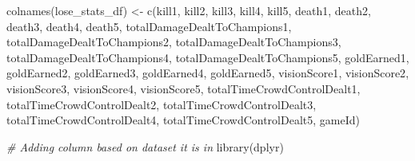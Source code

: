 \documentclass[
]{article}
\newenvironment{Shaded}{\begin{snugshade}}{\end{snugshade}}
\newcommand{\CommentTok}[1]{\textcolor[rgb]{0.56,0.35,0.01}{\textit{#1}}}
\newcommand{\FunctionTok}[1]{\textcolor[rgb]{0.00,0.00,0.00}{#1}}
\newcommand{\NormalTok}[1]{#1}
\newcommand{\OtherTok}[1]{\textcolor[rgb]{0.56,0.35,0.01}{#1}}
\newcommand{\StringTok}[1]{\textcolor[rgb]{0.31,0.60,0.02}{#1}}
\begin{document}
\begin{Shaded}
\begin{Highlighting}[]
\FunctionTok{colnames}\NormalTok{(lose\_stats\_df) }\OtherTok{\textless{}{-}} \FunctionTok{c}\NormalTok{(}\StringTok{\textquotesingle{}kill1\textquotesingle{}}\NormalTok{, }\StringTok{\textquotesingle{}kill2\textquotesingle{}}\NormalTok{, }\StringTok{\textquotesingle{}kill3\textquotesingle{}}\NormalTok{, }\StringTok{\textquotesingle{}kill4\textquotesingle{}}\NormalTok{, }\StringTok{\textquotesingle{}kill5\textquotesingle{}}\NormalTok{, }\StringTok{\textquotesingle{}death1\textquotesingle{}}\NormalTok{, }\StringTok{\textquotesingle{}death2\textquotesingle{}}\NormalTok{, }\StringTok{\textquotesingle{}death3\textquotesingle{}}\NormalTok{, }\StringTok{\textquotesingle{}death4\textquotesingle{}}\NormalTok{, }\StringTok{\textquotesingle{}death5\textquotesingle{}}\NormalTok{, }\StringTok{\textquotesingle{}totalDamageDealtToChampions1\textquotesingle{}}\NormalTok{, }\StringTok{\textquotesingle{}totalDamageDealtToChampions2\textquotesingle{}}\NormalTok{, }\StringTok{\textquotesingle{}totalDamageDealtToChampions3\textquotesingle{}}\NormalTok{, }\StringTok{\textquotesingle{}totalDamageDealtToChampions4\textquotesingle{}}\NormalTok{, }\StringTok{\textquotesingle{}totalDamageDealtToChampions5\textquotesingle{}}\NormalTok{, }\StringTok{\textquotesingle{}goldEarned1\textquotesingle{}}\NormalTok{, }\StringTok{\textquotesingle{}goldEarned2\textquotesingle{}}\NormalTok{, }\StringTok{\textquotesingle{}goldEarned3\textquotesingle{}}\NormalTok{, }\StringTok{\textquotesingle{}goldEarned4\textquotesingle{}}\NormalTok{, }\StringTok{\textquotesingle{}goldEarned5\textquotesingle{}}\NormalTok{, }\StringTok{\textquotesingle{}visionScore1\textquotesingle{}}\NormalTok{, }\StringTok{\textquotesingle{}visionScore2\textquotesingle{}}\NormalTok{, }\StringTok{\textquotesingle{}visionScore3\textquotesingle{}}\NormalTok{, }\StringTok{\textquotesingle{}visionScore4\textquotesingle{}}\NormalTok{, }\StringTok{\textquotesingle{}visionScore5\textquotesingle{}}\NormalTok{, }\StringTok{\textquotesingle{}totalTimeCrowdControlDealt1\textquotesingle{}}\NormalTok{, }\StringTok{\textquotesingle{}totalTimeCrowdControlDealt2\textquotesingle{}}\NormalTok{, }\StringTok{\textquotesingle{}totalTimeCrowdControlDealt3\textquotesingle{}}\NormalTok{, }\StringTok{\textquotesingle{}totalTimeCrowdControlDealt4\textquotesingle{}}\NormalTok{, }\StringTok{\textquotesingle{}totalTimeCrowdControlDealt5\textquotesingle{}}\NormalTok{, }\StringTok{\textquotesingle{}gameId\textquotesingle{}}\NormalTok{)}

\CommentTok{\# Adding column based on dataset it is in}
\FunctionTok{library}\NormalTok{(dplyr)}
\end{Highlighting}
\end{Shaded}
\end{document}
